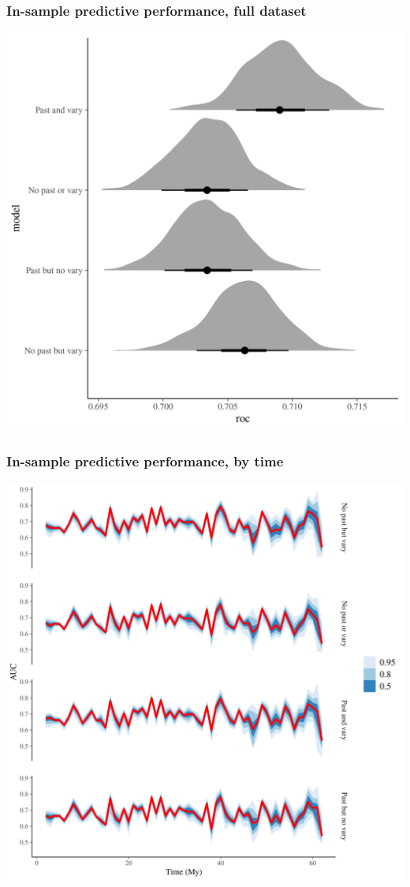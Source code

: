 \documentclass{beamer}
\begin{document}
\begin{frame}
  \frametitle{In-sample predictive performance, full dataset}

  \includegraphics[width=\textwidth,height=0.8\textheight,keepaspectratio=true]{../results/figure/roc_hist}

\end{frame}


\begin{frame}
  \frametitle{In-sample predictive performance, by time}

  \includegraphics[width=\textwidth,height=0.8\textheight,keepaspectratio=true]{../results/figure/roc_ts}

\end{frame}
\end{document}
